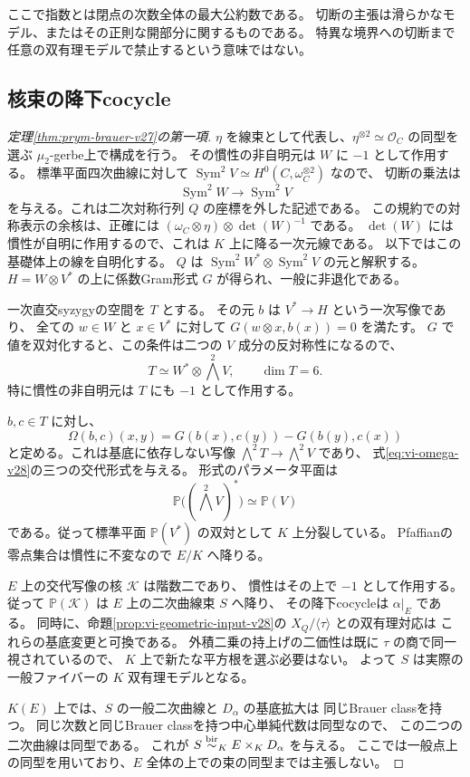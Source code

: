 ここで指数とは閉点の次数全体の最大公約数である。
切断の主張は滑らかなモデル、またはその正則な開部分に関するものである。
特異な境界への切断まで任意の双有理モデルで禁止するという意味ではない。

\subsection{核束の降下cocycle}
\begin{proof}[定理\ref{thm:prym-brauer-v27}の第一項]
$\eta$ を線束として代表し、$\eta^{\otimes2}\simeq\mathcal O_C$ の同型を選ぶ
$\mu_2$-gerbe上で構成を行う。
その慣性の非自明元は $W$ に $-1$ として作用する。
標準平面四次曲線に対して
$\operatorname{Sym}^2V\simeq H^0(C,\omega_C^{\otimes2})$ なので、
切断の乗法は
\[
 \operatorname{Sym}^2W\longrightarrow\operatorname{Sym}^2V
\]
を与える。これは二次対称行列 $Q$ の座標を外した記述である。
この規約での対称表示の余核は、正確には
$(\omega_C\otimes\eta)\otimes\det(W)^{-1}$ である。
$\det(W)$ には慣性が自明に作用するので、これは $K$ 上に降る一次元線である。
以下ではこの基礎体上の線を自明化する。
$Q$ は $\operatorname{Sym}^2W^*\otimes\operatorname{Sym}^2V$ の元と解釈する。
$H=W\otimes V^*$ の上に係数Gram形式 $G$ が得られ、一般に非退化である。

一次直交syzygyの空間を $T$ とする。
その元 $b$ は $V^*\to H$ という一次写像であり、
全ての $w\in W$ と $x\in V^*$ に対して
$G(w\otimes x,b(x))=0$ を満たす。
$G$ で値を双対化すると、この条件は二つの $V$ 成分の反対称性になるので、
\[
 T\simeq W^*\otimes\bigwedge^2V,\qquad \dim T=6.
\]
特に慣性の非自明元は $T$ にも $-1$ として作用する。

$b,c\in T$ に対し、
\[
 \Omega(b,c)(x,y)=G(b(x),c(y))-G(b(y),c(x))
\]
と定める。これは基底に依存しない写像
$\bigwedge^2T\to\bigwedge^2V$ であり、
式\eqref{eq:vi-omega-v28}の三つの交代形式を与える。
形式のパラメータ平面は
\[
 \mathbb P\bigl((\bigwedge^2V)^*\bigr)\simeq\mathbb P(V)
\]
である。従って標準平面 $\mathbb P(V^*)$ の双対として $K$ 上分裂している。
Pfaffianの零点集合は慣性に不変なので $E/K$ へ降りる。

$E$ 上の交代写像の核 $\mathcal K$ は階数二であり、
慣性はその上で $-1$ として作用する。
従って $\mathbb P(\mathcal K)$ は $E$ 上の二次曲線束 $S$ へ降り、
その降下cocycleは $\alpha|_E$ である。
同時に、命題\ref{prop:vi-geometric-input-v28}の $X_Q/\langle\tau\rangle$ との双有理対応は
これらの基底変更と可換である。
外積二乗の持上げの二価性は既に $\tau$ の商で同一視されているので、
$K$ 上で新たな平方根を選ぶ必要はない。
よって $S$ は実際の一般ファイバーの $K$ 双有理モデルとなる。

$K(E)$ 上では、$S$ の一般二次曲線と $D_\alpha$ の基底拡大は
同じBrauer classを持つ。
同じ次数と同じBrauer classを持つ中心単純代数は同型なので、
この二つの二次曲線は同型である。
これが $S\mathrel{\overset{\mathrm{bir}}{\sim}}_K E\times_KD_\alpha$ を与える。
ここでは一般点上の同型を用いており、$E$ 全体の上での束の同型までは主張しない。
\end{proof}


